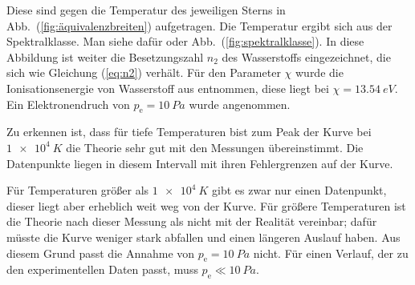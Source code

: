 Diese sind gegen die Temperatur des jeweiligen Sterns in Abb.\ (\ref{fig:äquivalenzbreiten}) aufgetragen.
Die Temperatur ergibt sich aus der Spektralklasse.
Man siehe dafür \cite{anleitung464} oder Abb.\ (\ref{fig:spektralklasse}).
In diese Abbildung ist weiter die Besetzungszahl $n_2$ des Wasserstoffs eingezeichnet, die sich wie Gleichung (\ref{eq:n2}) verhält.
Für den Parameter $\chi $ wurde die Ionisationsenergie von Wasserstoff aus \cite{saha} entnommen, diese liegt bei $\chi =\SI{13.54}{eV}$.
Ein Elektronendruch von $p_\text{e}=\SI{10}{Pa}$ wurde angenommen.

Zu erkennen ist, dass für tiefe Temperaturen bist zum Peak der Kurve bei $\SI{1e+4}{K}$ die Theorie sehr gut mit den Messungen übereinstimmt.
Die Datenpunkte liegen in diesem Intervall mit ihren Fehlergrenzen auf der Kurve.

Für Temperaturen größer als $\SI{1e+4}{K}$ gibt es zwar nur einen Datenpunkt, dieser liegt aber erheblich weit weg von der Kurve.
Für größere Temperaturen ist die Theorie nach dieser Messung als nicht mit der Realität vereinbar; dafür müsste die Kurve weniger stark abfallen und einen längeren Auslauf haben.
Aus diesem Grund passt die Annahme von $p_\text{e}=\SI{10}{Pa}$ nicht.
Für einen Verlauf, der zu den experimentellen Daten passt, muss $p_\text{e}\ll \SI{10}{Pa}$. %
